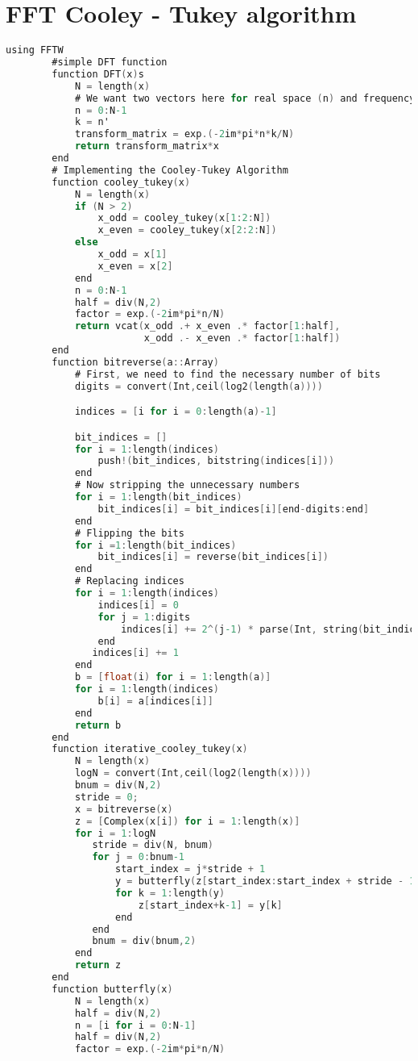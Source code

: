 
\label{ch:Appendix}

	\section{FFT Cooley - Tukey algorithm}
	\label{Cooley-Tukey_Code} 

	\begin{lstlisting}[language=C, caption= Cooley-Tukey with Butterfly Diagrams ]
		using FFTW
		#simple DFT function
		function DFT(x)s
		    N = length(x)
		    # We want two vectors here for real space (n) and frequency space (k)
		    n = 0:N-1
		    k = n'
		    transform_matrix = exp.(-2im*pi*n*k/N)
		    return transform_matrix*x
		end
		# Implementing the Cooley-Tukey Algorithm
		function cooley_tukey(x)
		    N = length(x)
		    if (N > 2)
		        x_odd = cooley_tukey(x[1:2:N])
		        x_even = cooley_tukey(x[2:2:N])
		    else
		        x_odd = x[1]
		        x_even = x[2]
		    end
		    n = 0:N-1
		    half = div(N,2)
		    factor = exp.(-2im*pi*n/N)
		    return vcat(x_odd .+ x_even .* factor[1:half],
		                x_odd .- x_even .* factor[1:half])
		end
		function bitreverse(a::Array)
		    # First, we need to find the necessary number of bits
		    digits = convert(Int,ceil(log2(length(a))))

		    indices = [i for i = 0:length(a)-1]

		    bit_indices = []
		    for i = 1:length(indices)
		        push!(bit_indices, bitstring(indices[i]))
		    end
		    # Now stripping the unnecessary numbers
		    for i = 1:length(bit_indices)
		        bit_indices[i] = bit_indices[i][end-digits:end]
		    end
		    # Flipping the bits
		    for i =1:length(bit_indices)
		        bit_indices[i] = reverse(bit_indices[i])
		    end
		    # Replacing indices
		    for i = 1:length(indices)
		        indices[i] = 0
		        for j = 1:digits
		            indices[i] += 2^(j-1) * parse(Int, string(bit_indices[i][end-j]))
		        end
		       indices[i] += 1
		    end
		    b = [float(i) for i = 1:length(a)]
		    for i = 1:length(indices)
		        b[i] = a[indices[i]]
		    end
		    return b
		end
		function iterative_cooley_tukey(x)
		    N = length(x)
		    logN = convert(Int,ceil(log2(length(x))))
		    bnum = div(N,2)
		    stride = 0;
		    x = bitreverse(x)
		    z = [Complex(x[i]) for i = 1:length(x)]
		    for i = 1:logN
		       stride = div(N, bnum)
		       for j = 0:bnum-1
		           start_index = j*stride + 1
		           y = butterfly(z[start_index:start_index + stride - 1])
		           for k = 1:length(y)
		               z[start_index+k-1] = y[k]
		           end
		       end
		       bnum = div(bnum,2)
		    end
		    return z
		end
		function butterfly(x)
		    N = length(x)
		    half = div(N,2)
		    n = [i for i = 0:N-1]
		    half = div(N,2)
		    factor = exp.(-2im*pi*n/N)


\end{lstlisting}
